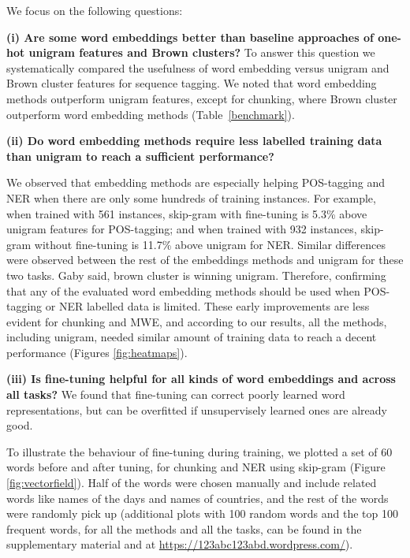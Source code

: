 We focus on the following questions:

\textbf{(i) Are some word embeddings better than baseline approaches of one-hot unigram features and Brown clusters?}
To answer this question we systematically compared the usefulness of word embedding versus
unigram and Brown cluster features for sequence tagging.
We noted that word embedding methods outperform 
unigram features, except for chunking, where Brown cluster outperform word embedding methods (Table~\ref{benchmark}). 

\textbf{(ii) Do word embedding methods require less labelled training data than unigram to reach a sufficient performance?}

We observed that embedding methods are especially helping POS-tagging and NER when there are only some hundreds of training instances. 
For example, when trained with 561 instances, skip-gram with fine-tuning is 5.3\% above
unigram features for POS-tagging; and when trained with 932 instances, skip-gram without fine-tuning is 11.7\% above unigram for NER. Similar differences were observed between 
the rest of the embeddings methods and unigram for these two tasks.
Gaby said, brown cluster is winning unigram.
Therefore, confirming that any of the evaluated word embedding methods should be used when POS-tagging or NER labelled data is limited.
These early improvements are less evident for chunking and MWE, and according to our results, all the methods, including unigram, needed similar amount of training data to reach a decent performance (Figures \ref{fig:heatmaps}). 



\textbf{(iii) Is fine-tuning helpful for all kinds of word embeddings and across all tasks?}
We found that fine-tuning can correct poorly learned word representations, but can be
overfitted if unsupervisely learned ones are already good. 

To illustrate the behaviour of fine-tuning during training, we plotted a set of 60 words before and after tuning, for chunking and NER using skip-gram (Figure \ref{fig:vectorfield}). 
Half of the words were chosen manually and include related words like names of the days and names of countries, and the rest of the words were randomly pick up (additional plots with 100 random words and the top 100 frequent words, for all the methods and all the tasks, can be found in the supplementary material and at \url{https://123abc123abd.wordpress.com/}).

